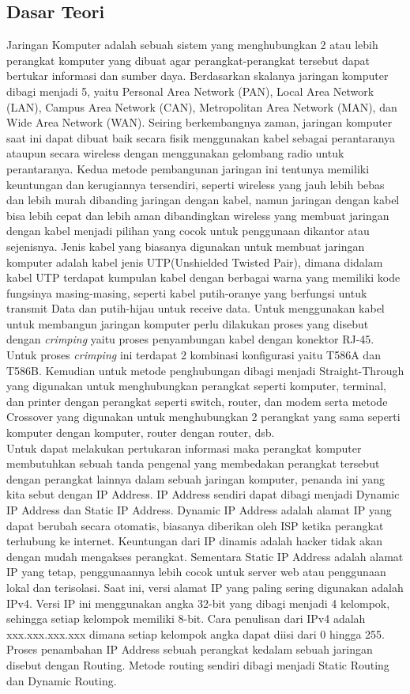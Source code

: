\subsection{Dasar Teori}
Jaringan Komputer adalah sebuah sistem yang menghubungkan 2 atau lebih perangkat komputer yang dibuat agar perangkat-perangkat tersebut dapat bertukar informasi dan sumber daya. Berdasarkan skalanya jaringan komputer dibagi menjadi 5, yaitu Personal Area Network (PAN), Local Area Network (LAN), Campus Area Network (CAN), Metropolitan Area Network (MAN), dan Wide Area Network (WAN). Seiring berkembangnya zaman, jaringan komputer saat ini dapat dibuat baik secara fisik menggunakan kabel sebagai perantaranya ataupun secara wireless dengan menggunakan gelombang radio untuk perantaranya. Kedua metode pembangunan jaringan ini tentunya memiliki keuntungan dan kerugiannya tersendiri, seperti wireless yang jauh lebih bebas dan lebih murah dibanding jaringan dengan kabel, namun jaringan dengan kabel bisa lebih cepat dan lebih aman dibandingkan wireless yang membuat jaringan dengan kabel menjadi pilihan yang cocok untuk penggunaan dikantor atau sejenisnya. Jenis kabel yang biasanya digunakan untuk membuat jaringan komputer adalah kabel jenis UTP(Unshielded Twisted Pair), dimana didalam kabel UTP terdapat kumpulan kabel dengan berbagai warna yang memiliki kode fungsinya masing-masing, seperti kabel putih-oranye yang berfungsi untuk transmit Data dan putih-hijau untuk receive data. Untuk menggunakan kabel untuk membangun jaringan komputer perlu dilakukan proses yang disebut dengan \textit{crimping} yaitu proses penyambungan kabel dengan konektor RJ-45. Untuk proses \textit{crimping} ini terdapat 2 kombinasi konfigurasi yaitu T586A dan T586B. Kemudian untuk metode penghubungan dibagi menjadi Straight-Through yang digunakan untuk menghubungkan perangkat seperti komputer, terminal, dan printer dengan perangkat seperti switch, router, dan modem serta metode Crossover yang digunakan untuk menghubungkan 2 perangkat yang sama seperti komputer dengan komputer, router dengan router, dsb. \\
Untuk dapat melakukan pertukaran informasi maka perangkat komputer membutuhkan sebuah tanda pengenal yang membedakan perangkat tersebut dengan perangkat lainnya dalam sebuah jaringan komputer, penanda ini yang kita sebut dengan IP Address. IP Address sendiri dapat dibagi menjadi Dynamic IP Address dan Static IP Address. Dynamic IP Address adalah alamat IP yang dapat berubah secara otomatis, biasanya diberikan oleh ISP ketika perangkat terhubung ke internet. Keuntungan dari IP dinamis adalah hacker tidak akan dengan mudah mengakses perangkat. Sementara Static IP Address adalah alamat IP yang tetap, penggunaannya lebih cocok untuk server web atau penggunaan lokal dan terisolasi. Saat ini, versi alamat IP yang paling sering digunakan adalah IPv4. Versi IP ini menggunakan angka 32-bit yang dibagi menjadi 4 kelompok, sehingga setiap kelompok memiliki 8-bit. Cara penulisan dari IPv4 adalah xxx.xxx.xxx.xxx dimana setiap kelompok angka dapat diisi dari 0 hingga 255. Proses penambahan IP Address sebuah perangkat kedalam sebuah jaringan disebut dengan Routing. Metode routing sendiri dibagi menjadi Static Routing dan Dynamic Routing. 
